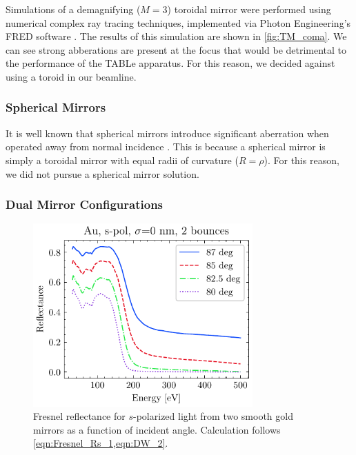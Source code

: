 Simulations of a demagnifying ($M=3$) toroidal mirror were performed using numerical complex ray tracing techniques, implemented via Photon Engineering's FRED software \cite{pfistererFREDOpticalEngineering,arnaudRepresentationGaussianBeams1985}. The results of this simulation are shown in \cref{fig:TM_coma}. We can see strong abberations are present at the focus that would be detrimental to the performance of the TABLe apparatus. For this reason, we decided against using a toroid in our beamline.

\subsubsection{Spherical Mirrors}

It is well known that spherical mirrors introduce significant aberration when operated away from normal incidence \cite{howellsMirrorsSynchrotronRadiationBeamlines1994}. This is because a spherical mirror is simply a toroidal mirror with equal radii of curvature ($R=\rho$). For this reason, we did not pursue a spherical mirror solution.

\subsubsection{Dual Mirror Configurations}

\begin{figure}
	\centering
	\includegraphics[width=0.75\textwidth]{figures/chap2/Au_ReflvsAngle_2bounce.pdf}
	\caption{Fresnel reflectance for $s$-polarized light from two smooth gold mirrors as a function of incident angle. Calculation follows \cref{eqn:Fresnel_Rs_1,eqn:DW_2}.}
	\label{fig:Au_ReflvsAngle_2bounce}
\end{figure}

